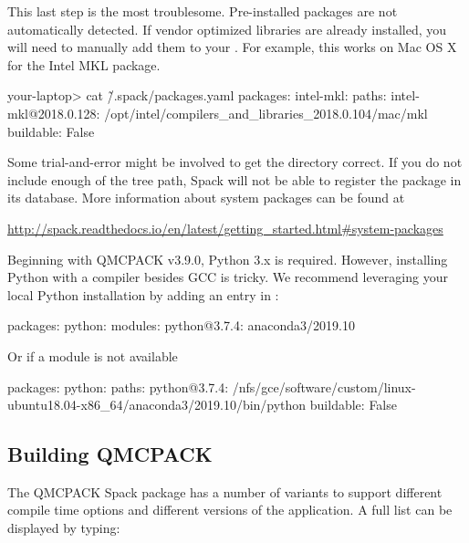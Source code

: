 This last step is the most troublesome. Pre-installed packages are not
automatically detected. If vendor optimized libraries are already
installed, you will need to manually add them to your
. For example, this works on Mac OS X
for the Intel MKL package.

\begin{shade}
your-laptop> cat \~/.spack/packages.yaml
packages:
    intel-mkl:
        paths:
            intel-mkl@2018.0.128: /opt/intel/compilers_and_libraries_2018.0.104/mac/mkl
        buildable: False
\end{shade}

Some trial-and-error might be involved to get the directory correct. If
you do not include enough of the tree path, Spack will not be able to
register the package in its database. More information about system
packages can be found at

\url{http://spack.readthedocs.io/en/latest/getting_started.html#system-packages}

Beginning with QMCPACK v3.9.0, Python 3.x is required. However,
installing Python with a compiler besides GCC is tricky. We recommend
leveraging your local Python installation by adding an entry in
:
\begin{shade}
packages:
    python:
       modules:
         python@3.7.4: anaconda3/2019.10
\end{shade}

Or if a module is not available
\begin{shade}
packages:
    python:
       paths:
          python@3.7.4: /nfs/gce/software/custom/linux-ubuntu18.04-x86_64/anaconda3/2019.10/bin/python
       buildable: False
\end{shade}


\subsection{Building QMCPACK}
The QMCPACK Spack package has a number of variants to support different compile time
options and different versions of the application. A full list can be displayed by typing:

